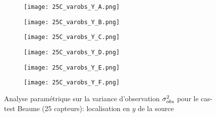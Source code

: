   
  
  \begin{figure}[p!]
  	\centering
  	\begin{subfigure}[t]{0.5\textwidth}
  		\centering
  		\texttt{[image: 25C\_varobs\_Y\_A.png]}
  		\caption{}
  		\label{varA_y}
  	\end{subfigure}%
  	\begin{subfigure}[t]{0.5\textwidth}
  		\centering
  		\texttt{[image: 25C\_varobs\_Y\_B.png]}
  		\caption{}
  		\label{varB_y}
  	\end{subfigure}
  	\begin{subfigure}[t]{0.5\textwidth}
  		\centering
  		\texttt{[image: 25C\_varobs\_Y\_C.png]}
  		\caption{}
  		\label{varC_y}
  	\end{subfigure}%
  	\begin{subfigure}[t]{0.5\textwidth}
  		\centering
  		\texttt{[image: 25C\_varobs\_Y\_D.png]}
  		\caption{}
  		\label{varD_y}
  	\end{subfigure}
  	\begin{subfigure}[t]{0.5\textwidth}
  		\centering
  		\texttt{[image: 25C\_varobs\_Y\_E.png]}
  		\caption{}
  		\label{varE_y}
  	\end{subfigure}%
  	\begin{subfigure}[t]{0.5\textwidth}
  		\centering
  		\texttt{[image: 25C\_varobs\_Y\_F.png]}
  		\caption{}
  		\label{varF_y}
  	\end{subfigure}
  	\caption{Analyse paramétrique sur la variance d'observation ${\sigma_{obs}^2}$ pour le cas-test Beaune (25 capteurs): localisation en $y$ de la source}
  	\label{fig_25C_analyse_varobs_y}
  	
  \end{figure}
  
